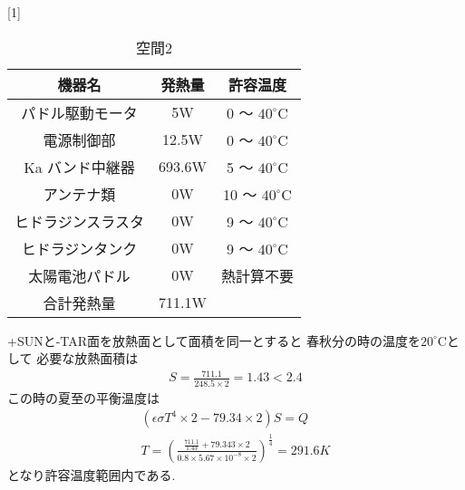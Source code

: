 \documentclass[15pt,uplatex,dvipdfmx]{jsarticle}
\begin{document}
\begin{table}[H]
  \begin{center}
  \caption{空間2}
  \scalebox{1}[1]{
  \begin{tabular}{|c|c|c|} \hline
    機器名 &  発熱量 & 許容温度 \\ \hline

  パドル駆動モータ
  & 5W
  & 0 〜 ${40}^\circ\mathrm{C}$\\

  電源制御部
  & 12.5W
  & 0 〜 ${40}^\circ\mathrm{C}$\\

  Ka バンド中継器
  & 693.6W
  & 5 〜 ${40}^\circ\mathrm{C}$\\

  アンテナ類
  & 0W
  & 10 〜 ${40}^\circ\mathrm{C}$\\

  ヒドラジンスラスタ
  & 0W
  & 9 〜 ${40}^\circ\mathrm{C}$\\

  ヒドラジンタンク
  & 0W
  & 9 〜 ${40}^\circ\mathrm{C}$\\

  太陽電池パドル
  & 0W
  &  熱計算不要\\ \hline

  合計発熱量
  & 711.1W
  & \\\hline
  \end{tabular}
  }
\end{center}
\end{table}

+SUNと-TAR面を放熱面として面積を同一とすると
春秋分の時の温度を${20}^\circ\mathrm{C}$として
必要な放熱面積は
\begin{eqnarray}
  S=\frac{711.1}{248.5\times2}=1.43<2.4
\end{eqnarray}
この時の夏至の平衡温度は
\begin{eqnarray}
  (\epsilon\sigma T^4\times2 -79.34\times2)S=Q\\
  T =(\frac{\frac{711.1}{1.43}+79.343\times2}
  {0.8\times5.67\times10^{-8}\times2})^{\frac{1}{4}}=291.6K
\end{eqnarray}
となり許容温度範囲内である.
\end{document}
